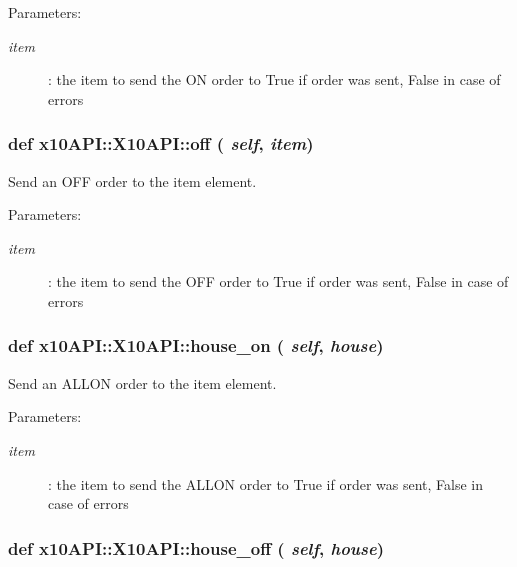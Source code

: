 \begin{Desc}
\item[Parameters:]
\begin{description}
\item[{\em item}]: the item to send the ON order to  True if order was sent, False in case of errors \end{description}
\end{Desc}
\hypertarget{classx10API_1_1X10API_37be53c20aaa39f5770a5085b80984bc}{
\subsubsection[off]{\setlength{\rightskip}{0pt plus 5cm}def x10API::X10API::off ( {\em self}, \/   {\em item})}}
\label{classx10API_1_1X10API_37be53c20aaa39f5770a5085b80984bc}


Send an OFF order to the item element. 

\begin{Desc}
\item[Parameters:]
\begin{description}
\item[{\em item}]: the item to send the OFF order to  True if order was sent, False in case of errors \end{description}
\end{Desc}
\hypertarget{classx10API_1_1X10API_d1e63a9dd573eb16a7d1009c72fac15e}{
\subsubsection[house\_\-on]{\setlength{\rightskip}{0pt plus 5cm}def x10API::X10API::house\_\-on ( {\em self}, \/   {\em house})}}
\label{classx10API_1_1X10API_d1e63a9dd573eb16a7d1009c72fac15e}


Send an ALLON order to the item element. 

\begin{Desc}
\item[Parameters:]
\begin{description}
\item[{\em item}]: the item to send the ALLON order to  True if order was sent, False in case of errors \end{description}
\end{Desc}
\hypertarget{classx10API_1_1X10API_b04c7647aa5d80c462f0df36afaff4ec}{
\subsubsection[house\_\-off]{\setlength{\rightskip}{0pt plus 5cm}def x10API::X10API::house\_\-off ( {\em self}, \/   {\em house})}}
\label{classx10API_1_1X10API_b04c7647aa5d80c462f0df36afaff4ec}


